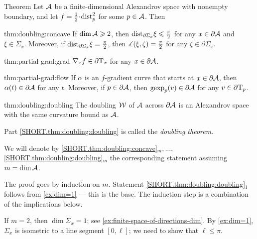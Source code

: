 \begin{thm}{Theorem}\label{thm:doubling}
Let $\mathcal{A}$ be a finite-dimensional Alexandrov space with nonempty boundary,
and let $f\z=\tfrac12\cdot\distfun_p^2$ for some $p\in \mathcal{A}$.
Then

\begin{subthm}{thm:doubling:concave}
If $\operatorname{\rm dim}\nolimits \mathcal{A}\geqslant 2$, then
$\mathrm{dist}_{\partial \Sigma_x}\xi\leqslant \tfrac\pi2$ for any $x\in\partial \mathcal{A}$ and $\xi\in \Sigma_x$.
Moreover, if $\mathrm{dist}_{\partial \Sigma_x}\xi= \tfrac\pi2$, then $\measuredangle(\xi,\zeta)=\tfrac\pi2$ for any $\zeta\in \partial\Sigma_x$.
\end{subthm}

\begin{subthm}{thm:partial-grad:grad}
$\nabla_xf\in \partial\mathrm{T}_x$ for any $x\in\partial \mathcal{A}$.
\end{subthm}

\begin{subthm}{thm:partial-grad:flow}
If $\alpha$ is an $f$-gradient curve that starts at $x\in \partial \mathcal{A}$, then $\alpha(t)\in \partial \mathcal{A}$ for any $t$.
Moreover, if $p\in \partial \mathcal{A}$, then $\operatorname{\rm gexp}\nolimits_p(v)\in \partial \mathcal{A}$ for any $v\in\partial\mathrm{T}_p$.
\end{subthm}

\begin{subthm}{thm:doubling:doubling}
The doubling $\mathcal{W}$ of $\mathcal{A}$ across $\partial \mathcal{A}$ is an Alexandrov space with the same curvature bound as $\mathcal{A}$.
\end{subthm}

\end{thm}

Part \ref{SHORT.thm:doubling:doubling} is called the {}\emph{doubling theorem}.

We will denote by 
\ref{SHORT.thm:doubling:concave}$_m,\dots,$\ref{SHORT.thm:doubling:doubling}$_m$ the corresponding statement assuming $m=\operatorname{\rm dim}\nolimits\mathcal{A}$.

The proof goes by induction on $m$.
Statement \ref{SHORT.thm:doubling:doubling}$_1$ follows from \ref{ex:dim=1} --- this is the base.
The induction step is a combination of the implications below.

If $m=2$, then $\dim\Sigma_x=1$; see \ref{ex:finite-space-of-directions-dim}.
By \ref{ex:dim=1}, $\Sigma_x$ is isometric to a line segment $[0,\ell]$;
we need to show that $\ell\le\pi$.

